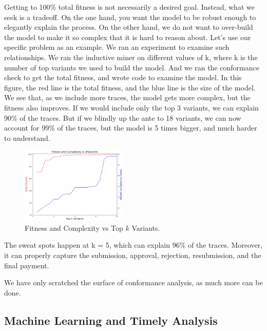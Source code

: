 \documentclass[conference]{IEEEtran}
\begin{document}
Getting to 100\% total fitness is not necessarily a desired goal.
Instead, what we seek is a tradeoff. On the one hand, you want the model
to be robust enough to elegantly explain the process. On the other hand,
we do not want to over-build the model to make it so complex that it is
hard to reason about. Let's use our specific problem as an example. We
ran an experiment to examine such relationships. We ran the inductive
miner on different values of k, where k is the number of top variants we
used to build the model. And we ran the conformance check to get the
total fitness, and wrote code to examine the model. In this figure, the
red line is the total fitness, and the blue line is the size of the
model. We see that, as we include more traces, the model gets more
complex, but the fitness also improves. If we would include only the top
3 variants, we can explain 90\% of the traces. But if we blindly up the
ante to 18 variants, we can now account for 99\% of the traces, but the
model is 5 times bigger, and much harder to understand.

\begin{figure}[htbp]
\centerline{\includegraphics[width=0.45\textwidth]{images/tradeoff.png}}
\caption{Fitness and Complexity vs Top $k$ Variants.}
\label{fig}
\end{figure}

The sweat spots happen at k = 5, which can explain 96\% of the traces.
Moreover,
it can properly capture the submission, approval, rejection,
resubmission, and the final payment.


We have only scratched the surface of conformance analysis, as much more
can be done.

\subsection{Machine Learning and Timely
Analysis}
\end{document}
